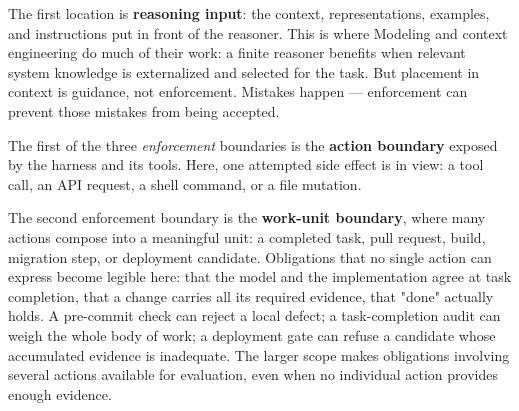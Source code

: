 


The first location is \textbf{reasoning input}: the context, representations, examples, and instructions put in front of the reasoner. This is where Modeling and context engineering do much of their work: a finite reasoner benefits when relevant system knowledge is externalized and selected for the task. But placement in context is guidance, not enforcement. Mistakes happen — enforcement can prevent those mistakes from being accepted.




The first of the three \emph{enforcement} boundaries is the \textbf{action boundary} exposed by the harness and its tools. Here, one attempted side effect is in view: a tool call, an API request, a shell command, or a file mutation.



The second enforcement boundary is the \textbf{work-unit boundary}, where many actions compose into a meaningful unit: a completed task, pull request, build, migration step, or deployment candidate. Obligations that no single action can express become legible here: that the model and the implementation agree at task completion, that a change carries all its required evidence, that "done" actually holds. A pre-commit check can reject a local defect; a task-completion audit can weigh the whole body of work; a deployment gate can refuse a candidate whose accumulated evidence is inadequate. The larger scope makes obligations involving several actions available for evaluation, even when no individual action provides enough evidence.

